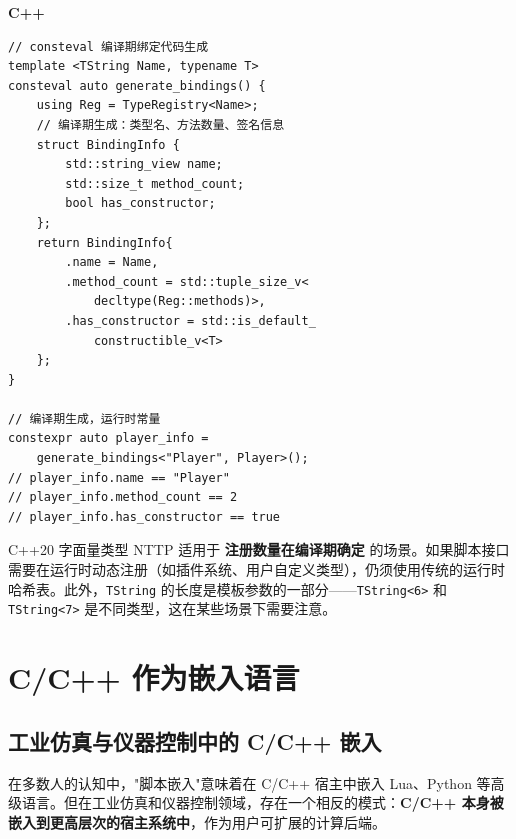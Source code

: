 \documentclass[12pt,a4paper,fontset=fandol]{ctexbook}
\newenvironment{note}[1][]{%
  \begin{tcolorbox}[enhanced,breakable,
    colback=orange!5!white,colframe=orange!80!black,
    boxed title style={colback=orange!80!black},
    attach boxed title to top left={yshift=-2mm,xshift=2mm},
    arc=2mm,boxrule=0.8mm,
    title={注意},#1]}%
  {\end{tcolorbox}}
\newcommand{\Tp}[1]{\texttt{#1}}
\newcommand{\cpplabel}{%
  \noindent\begin{tcolorbox}[colback=algheadbg,coltext=white,
    sharp corners,boxrule=0pt,width=3.0em,height=1.4em,
    halign=center,valign=center,nobeforeafter,left=0pt,right=0pt,
    top=0pt,bottom=0pt]\small\bfseries C++\end{tcolorbox}}
\begin{document}
\cpplabel
\begin{lstlisting}[style=cppstyle]
// consteval 编译期绑定代码生成
template <TString Name, typename T>
consteval auto generate_bindings() {
    using Reg = TypeRegistry<Name>;
    // 编译期生成：类型名、方法数量、签名信息
    struct BindingInfo {
        std::string_view name;
        std::size_t method_count;
        bool has_constructor;
    };
    return BindingInfo{
        .name = Name,
        .method_count = std::tuple_size_v<
            decltype(Reg::methods)>,
        .has_constructor = std::is_default_
            constructible_v<T>
    };
}

// 编译期生成，运行时常量
constexpr auto player_info =
    generate_bindings<"Player", Player>();
// player_info.name == "Player"
// player_info.method_count == 2
// player_info.has_constructor == true
\end{lstlisting}

\begin{note}[title={适用边界}]
C++20 字面量类型 NTTP 适用于 \textbf{注册数量在编译期确定} 的场景。如果脚本接口需要在运行时动态注册（如插件系统、用户自定义类型），仍须使用传统的运行时哈希表。此外，\Tp{TString} 的长度是模板参数的一部分——\Tp{TString<6>} 和 \Tp{TString<7>} 是不同类型，这在某些场景下需要注意。
\end{note}


\chapter{C/C++ 作为嵌入语言}\label{app:cpp-embedded}

\section{工业仿真与仪器控制中的 C/C++ 嵌入}\label{sec:cpp-industrial}

在多数人的认知中，"脚本嵌入"意味着在 C/C++ 宿主中嵌入 Lua、Python 等高级语言。但在工业仿真和仪器控制领域，存在一个相反的模式：\textbf{C/C++ 本身被嵌入到更高层次的宿主系统中}，作为用户可扩展的计算后端。
\end{document}
